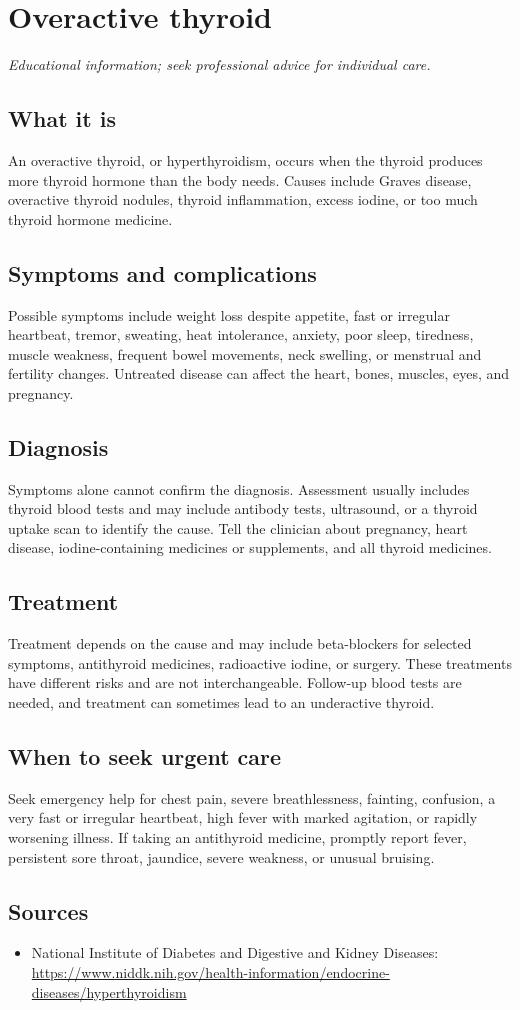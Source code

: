 \chapter{Overactive thyroid}

\medskip
\noindent\textit{Educational information; seek professional advice for individual care.}

\section*{What it is}
An overactive thyroid, or hyperthyroidism, occurs when the thyroid produces more thyroid hormone than the body needs. Causes include Graves disease, overactive thyroid nodules, thyroid inflammation, excess iodine, or too much thyroid hormone medicine.

\section*{Symptoms and complications}
Possible symptoms include weight loss despite appetite, fast or irregular heartbeat, tremor, sweating, heat intolerance, anxiety, poor sleep, tiredness, muscle weakness, frequent bowel movements, neck swelling, or menstrual and fertility changes. Untreated disease can affect the heart, bones, muscles, eyes, and pregnancy.

\section*{Diagnosis}
Symptoms alone cannot confirm the diagnosis. Assessment usually includes thyroid blood tests and may include antibody tests, ultrasound, or a thyroid uptake scan to identify the cause. Tell the clinician about pregnancy, heart disease, iodine-containing medicines or supplements, and all thyroid medicines.

\section*{Treatment}
Treatment depends on the cause and may include beta-blockers for selected symptoms, antithyroid medicines, radioactive iodine, or surgery. These treatments have different risks and are not interchangeable. Follow-up blood tests are needed, and treatment can sometimes lead to an underactive thyroid.

\section*{When to seek urgent care}
Seek emergency help for chest pain, severe breathlessness, fainting, confusion, a very fast or irregular heartbeat, high fever with marked agitation, or rapidly worsening illness. If taking an antithyroid medicine, promptly report fever, persistent sore throat, jaundice, severe weakness, or unusual bruising.

\section*{Sources}
\begin{itemize}
\item National Institute of Diabetes and Digestive and Kidney Diseases: \url{https://www.niddk.nih.gov/health-information/endocrine-diseases/hyperthyroidism}
\end{itemize}
